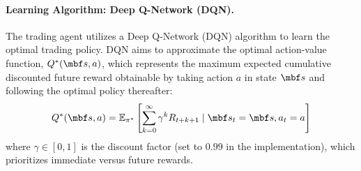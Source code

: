 \documentclass[12pt,a4paper]{article}
\begin{document}
\paragraph{Learning Algorithm: Deep Q-Network (DQN).}
The trading agent utilizes a Deep Q-Network (DQN) algorithm \cite{Mnih2015HumanlevelCT} to learn the optimal trading policy. DQN aims to approximate the optimal action-value function, $Q^*(\mbf s, a)$, which represents the maximum expected cumulative discounted future reward obtainable by taking action $a$ in state $\mbf s$ and following the optimal policy thereafter:
%
\[
Q^*(\mbf s, a) = \mathbb{E}_{\pi^*} \left[ \sum_{k=0}^{\infty} \gamma^k R_{t+k+1} \mid \mbf s_t = \mbf s, a_t = a \right]
\]
%
where $\gamma \in [0,1]$ is the discount factor (set to $0.99$ in the implementation), which prioritizes immediate versus future rewards.
\end{document}
